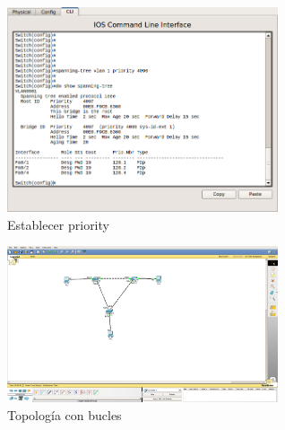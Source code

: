 \documentclass{udpreport}
\begin{document}
	\begin{figure}[h]
    \centering
    \includegraphics[width=8cm]{7.png}
    \caption{Establecer priority}
    \end{figure}
	 
    \begin{figure}[h]
    \centering
    \includegraphics[width=8cm]{8.png}
    \caption{Topología con bucles}
    \end{figure}
    
	\caption{Topología con prioridad}\\\\
	
\end{document}

